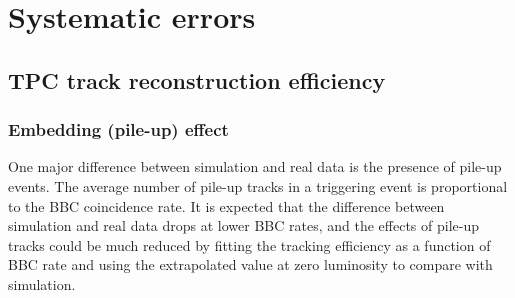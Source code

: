 

\chapter{Systematic errors}\label{chap:systematicErrors}
\section{TPC track reconstruction efficiency}\label{sec:tpcSystematics}
\subsection{Embedding (pile-up) effect}\label{subsec:TpcEffSystPileUp}
One major difference between simulation and real data is the presence of pile-up
events. The average number of pile-up tracks in
a triggering event is proportional to the BBC coincidence rate. It is expected that
the difference between simulation and real data drops at lower BBC rates, and the
effects of pile-up tracks could be much reduced by fitting the tracking efficiency as a
function of BBC rate and using the extrapolated value at zero luminosity to compare
with simulation.\newline

